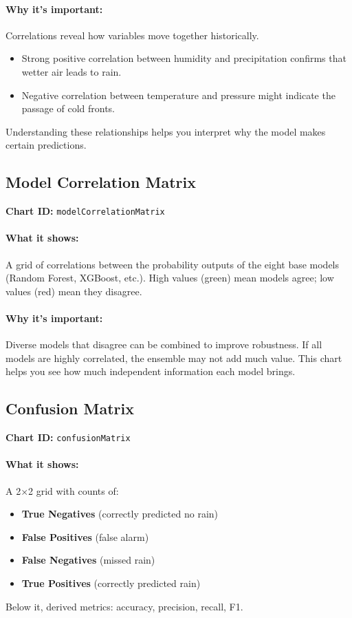 \documentclass[11pt,a4paper]{article}
\begin{document}
	\paragraph{Why it’s important:}
	Correlations reveal how variables move together historically.
	\begin{itemize}
		\item Strong positive correlation between humidity and precipitation confirms that wetter air leads to rain.
		\item Negative correlation between temperature and pressure might indicate the passage of cold fronts.
	\end{itemize}
	Understanding these relationships helps you interpret why the model makes certain predictions.
	
	\subsection{Model Correlation Matrix}
	\textbf{Chart ID:} \texttt{modelCorrelationMatrix}
	
	\paragraph{What it shows:}
	A grid of correlations between the probability outputs of the eight base models (Random Forest, XGBoost, etc.). High values (green) mean models agree; low values (red) mean they disagree.
	
	\paragraph{Why it’s important:}
	Diverse models that disagree can be combined to improve robustness. If all models are highly correlated, the ensemble may not add much value. This chart helps you see how much independent information each model brings.
	
	\subsection{Confusion Matrix}
	\textbf{Chart ID:} \texttt{confusionMatrix}
	
	\paragraph{What it shows:}
	A 2×2 grid with counts of:
	\begin{itemize}
		\item \textbf{True Negatives} (correctly predicted no rain)
		\item \textbf{False Positives} (false alarm)
		\item \textbf{False Negatives} (missed rain)
		\item \textbf{True Positives} (correctly predicted rain)
	\end{itemize}
	Below it, derived metrics: accuracy, precision, recall, F1.
	
\end{document}
